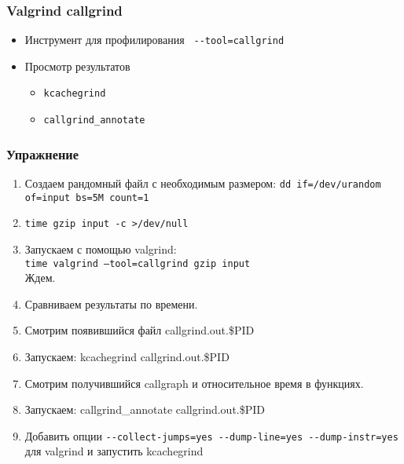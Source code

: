 \begin{frame}[fragile]
 \frametitle{Valgrind callgrind}
 \begin{itemize}
  \item Инструмент для профилирования \verb+ --tool=callgrind+
  \item Просмотр результатов
    \begin{itemize}
      \item \texttt{kcachegrind}
      \item \texttt{callgrind\_annotate}
    \end{itemize}
 \end{itemize}
\end{frame}


\begin{frame}[fragile]
    \frametitle{Упражнение}
    \begin{enumerate}
        \item Создаем рандомный файл с необходимым размером: {\tt dd if=/dev/urandom of=input bs=5M count=1}
        \item {\tt time gzip input -c >/dev/null}
        \item Запускаем с помощью valgrind: \\
	    {\tt time valgrind --tool=callgrind gzip input} \\
	    Ждем.
        \item Сравниваем результаты по времени.
        \item Смотрим появившийся файл callgrind.out.\$PID
        \item Запускаем: kcachegrind callgrind.out.\$PID
	\item Смотрим получившийся callgraph и относительное время в функциях.
        \item Запускаем: callgrind\_annotate callgrind.out.\$PID
        \item Добавить опции {\tt -{}-collect-jumps=yes -{}-dump-line=yes -{}-dump-instr=yes} для valgrind и запустить kcachegrind
    \end{enumerate}
\end{frame}
